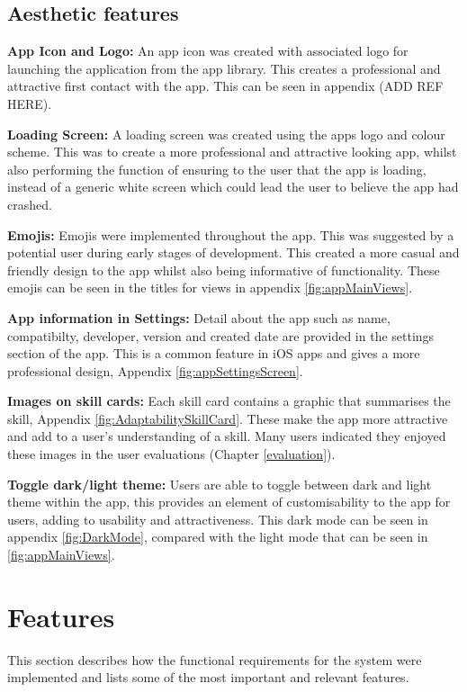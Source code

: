\documentclass{l4proj}
\begin{document}
\subsection{Aesthetic features}

\textbf{App Icon and Logo:} An app icon was created with associated logo for launching the application from the app library. This creates a professional and attractive first contact with the app. This can be seen in appendix (ADD REF HERE).

\textbf{Loading Screen:} A loading screen was created using the apps logo and colour scheme. This was to create a more professional and attractive looking app, whilst also performing the function of ensuring to the user that the app is loading, instead of a generic white screen which could lead the user to believe the app had crashed.

\textbf{Emojis:} Emojis were implemented throughout the app. This was suggested by a potential user during early stages of development. This created a more casual and friendly design to the app whilst also being informative of functionality. These emojis can be seen in the titles for views in appendix \ref{fig:appMainViews}.

\textbf{App information in Settings:} Detail about the app such as name, compatibilty, developer, version and created date are provided in the settings section of the app. This is a common feature in iOS apps and gives a more professional design, Appendix \ref{fig:appSettingsScreen}.

\textbf{Images on skill cards:} Each skill card contains a graphic that summarises the skill, Appendix \ref{fig:AdaptabilitySkillCard}. These make the app more attractive and add to a user's understanding of a skill. Many users indicated they enjoyed these images in the user evaluations (Chapter \ref{evaluation}).

\textbf{Toggle dark/light theme:} Users are able to toggle between dark and light theme within the app, this provides an element of customisability to the app for users, adding to usability and attractiveness. This dark mode can be seen in appendix \ref{fig:DarkMode}, compared with the light mode that can be seen in \ref{fig:appMainViews}. 


\section{Features}

This section describes how the functional requirements for the system were implemented and lists some of the most important and relevant features. 
\end{document}
